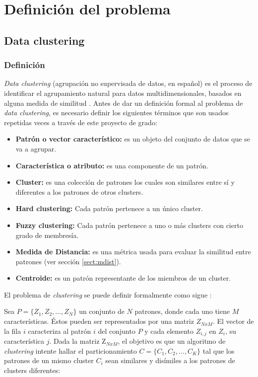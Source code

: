 \chapter{Definición del problema} 
\label{chap:dclust}

\section{Data clustering} 
\label{sect:dclust}

\subsection{Definición} 
\label{sect:dclustdef} \label{sect:dclustd}

    \emph{Data clustering} (agrupación no supervisada de datos, en español) es
el proceso de identificar el agrupamiento natural para datos multidimensionales,
basados en alguna medida de similitud \cite{DC_0}. Antes de dar un definición
formal al problema de \emph{data clustering}, es necesario definir los
siguientes términos que son usados repetidas veces a través de este proyecto de
grado\cite{SwAjAm2009}:

\begin{itemize}

\item {\bf Patrón o vector característico:} es un objeto del conjunto de datos
que se va a agrupar.
\item {\bf Característica o atributo:} es una componente de un patrón.
\item {\bf Cluster:} es una colección de patrones los cuales son similares entre
sí y diferentes a los patrones de otros clusters.
\item {\bf Hard clustering:} Cada patrón pertenece a un único cluster.
\item {\bf Fuzzy clustering:} Cada patrón pertenece a uno o más clusters con cierto grado de membresía.
\item {\bf Medida de Distancia:} es una métrica usada para evaluar la si\-mi\-li\-tud
entre patrones (ver sección \ref{sect:mdist}).
\item {\bf Centroide:} es un patrón representante de los miembros de un cluster.
\end{itemize}

 El problema de \emph{clustering} se puede definir formalmente como sigue \cite{DC_1}:

Sea $P = \{ Z_1, Z_2, \dots , Z_N\}$ un conjunto de $N$ patrones, 
donde cada uno tiene $M$ características. Éstos pueden
ser representados por una matriz $Z_{NxM}$. El vector de la fila $i$ ca\-rac\-te\-ri\-za al 
patrón $i$ del conjunto $P$ y cada elemento $Z_{i,j}$ en $Z_i$, su característica $j$.
Dada la matriz Z$_{NxM}$, el objetivo es que un algoritmo de \emph{clustering}
intente hallar el particionamiento $C = \{ C_1, C_2, \dots , C_K \}$ tal que los
patrones de un mismo cluster $C_i$ sean similares y disímiles a los patrones
de clusters diferentes:

